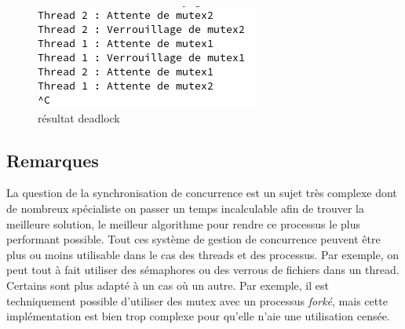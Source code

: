 \begin{figure}[ht]
    \centering
    \includegraphics[width=0.8\linewidth]{deadlock.png}
    \caption{résultat deadlock}
    \label{fig:result_deadlock}
\end{figure}

\subsection{Remarques}

La question de la synchronisation de concurrence est un sujet très complexe dont de nombreux spécialiste on passer un temps incalculable afin de trouver la meilleure solution, le meilleur algorithme pour rendre ce processus le plus performant possible. Tout ces système de gestion de concurrence peuvent être plus ou moins utilisable dans le cas des threads et des processus. Par exemple, on peut tout à fait utiliser des sémaphores ou des verrous de fichiers dans un thread. Certains sont plus adapté à un cas où un autre. Par exemple, il est techniquement possible d'utiliser des mutex avec un processus \textit{forké}, mais cette implémentation est bien trop complexe pour qu'elle n'aie une utilisation censée. 


